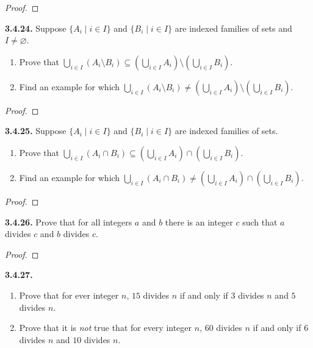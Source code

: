 \documentclass[12pt]{amsart}
\newenvironment{statement}[1]{\smallskip\noindent\color[rgb]{.6627, .3529, .6314} {\bf #1.}}{}
\theoremstyle{definition}
\theoremstyle{remark}
\begin{document}
\begin{proof}
\end{proof}


\begin{statement}{3.4.24}
Suppose $\{ A_i \mid i \in I \}$ and $\{ B_i \mid i \in I \}$ are indexed families of sets and $I \neq \varnothing$.
\begin{enumerate}
	\item Prove that $\bigcup_{i \in I} (A_i \setminus B_i) \subseteq
	\left( \bigcup_{i \in I} A_i \right) \setminus \left( \bigcup_{i \in I} B_i \right)$.
	
	\item Find an example for which $\bigcup_{i \in I} (A_i \setminus B_i) \neq
	\left( \bigcup_{i \in I} A_i \right) \setminus \left( \bigcup_{i \in I} B_i \right)$.
\end{enumerate}
\end{statement}

\begin{proof}
\end{proof}


\begin{statement}{3.4.25}
Suppose $\{ A_i \mid i \in I \}$ and $\{ B_i \mid i \in I \}$ are indexed families of sets.
\begin{enumerate}
	\item Prove that $\bigcup_{i \in I} (A_i \cap B_i) \subseteq
	\left( \bigcup_{i \in I} A_i \right) \cap \left( \bigcup_{i \in I} B_i \right)$.
	
	\item Find an example for which $\bigcup_{i \in I} (A_i \cap B_i) \neq
	\left( \bigcup_{i \in I} A_i \right) \cap \left( \bigcup_{i \in I} B_i \right)$.
\end{enumerate}
\end{statement}

\begin{proof}
\end{proof}


\begin{statement}{3.4.26}
Prove that for all integers $a$ and $b$ there is an integer $c$ such that $a$ divides $c$ and $b$ divides $c$.
\end{statement}

\begin{proof}
\end{proof}


\begin{statement}{3.4.27}
\begin{enumerate}
	\item Prove that for ever integer $n$, $15$ divides $n$ if and only if
	$3$ divides $n$ and $5$ divides $n$.
	
	\item Prove that it is \emph{not} true that for every integer $n$,
	$60$ divides $n$ if and only if $6$ divides $n$ and $10$ divides $n$.
\end{enumerate}
\end{statement}
\end{document}

